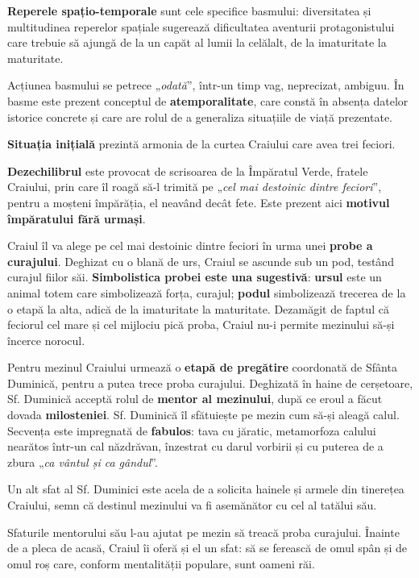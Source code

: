 \documentclass{article}
\newcommand{\qu}[1]{„\emph{#1}”}
\begin{document}
\textbf{Reperele spațio-temporale} sunt cele specifice basmului: diversitatea și multitudinea reperelor spațiale sugerează dificultatea aventurii protagonistului care trebuie să ajungă de la un capăt al lumii la celălalt, de la imaturitate la maturitate.

Acțiunea basmului se petrece \qu{odată}, într-un timp vag, neprecizat, ambiguu. În basme este prezent conceptul de \textbf{atemporalitate}, care constă în absența datelor istorice concrete și care are rolul de a generaliza situațiile de viață prezentate.

\textbf{Situația inițială} prezintă armonia de la curtea Craiului care avea trei feciori.

\textbf{Dezechilibrul} este provocat de scrisoarea de la Împăratul Verde, fratele Craiului, prin care îl roagă să-l trimită pe \qu{cel mai destoinic dintre feciori}, pentru a moșteni împărăția, el neavând decât fete. Este prezent aici \textbf{motivul împăratului fără urmași}.

Craiul îl va alege pe cel mai destoinic dintre feciori în urma unei \textbf{probe a curajului}. Deghizat cu o blană de urs, Craiul se ascunde sub un pod, testând curajul fiilor săi. \textbf{Simbolistica probei este una sugestivă}: \textbf{ursul} este un animal totem care simbolizează forța, curajul; \textbf{podul} simbolizează trecerea de la o etapă la alta, adică de la imaturitate la maturitate. Dezamăgit de faptul că feciorul cel mare și cel mijlociu pică proba, Craiul nu-i permite mezinului să-și încerce norocul.

Pentru mezinul Craiului urmează o \textbf{etapă de pregătire} coordonată de Sfânta Duminică, pentru a putea trece proba curajului. Deghizată în haine de cerșetoare, Sf. Duminică acceptă rolul de \textbf{mentor al mezinului}, după ce eroul a făcut dovada \textbf{milosteniei}. Sf. Duminică îl sfătuiește pe mezin cum să-și aleagă calul. Secvența este impregnată de \textbf{fabulos}: tava cu jăratic, metamorfoza calului nearătos într-un cal năzdrăvan, înzestrat cu darul vorbirii și cu puterea de a zbura \qu{ca vântul și ca gândul}.

Un alt sfat al Sf. Duminici este acela de a solicita hainele și armele din tinerețea Craiului, semn că destinul mezinului va fi asemănător cu cel al tatălui său.

Sfaturile mentorului său l-au ajutat pe mezin să treacă proba curajului. Înainte de a pleca de acasă, Craiul îi oferă și el un sfat: să se ferească de omul spân și de omul roș care, conform mentalității populare, sunt oameni răi.
\end{document}
